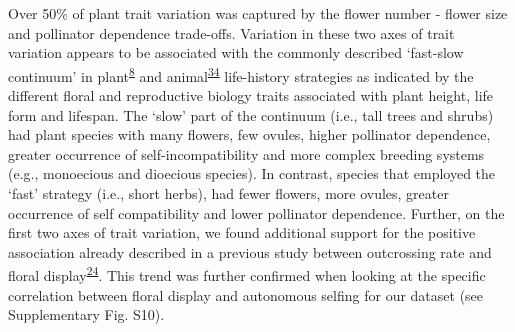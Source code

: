 \documentclass[12pt,a4paper,]{article}
\begin{document}
Over 50\% of plant trait variation was captured by the flower number -
flower size and pollinator dependence trade-offs. Variation in these two
axes of trait variation appears to be associated with the commonly
described `fast-slow continuum' in
plant\textsuperscript{\protect\hyperlink{ref-salguero2016}{8}} and
animal\textsuperscript{\protect\hyperlink{ref-healy2019}{34}}
life-history strategies as indicated by the different floral and
reproductive biology traits associated with plant height, life form and
lifespan. The `slow' part of the continuum (i.e., tall trees and shrubs)
had plant species with many flowers, few ovules, higher pollinator
dependence, greater occurrence of self-incompatibility and more complex
breeding systems (e.g., monoecious and dioecious species). In contrast,
species that employed the `fast' strategy (i.e., short herbs), had fewer
flowers, more ovules, greater occurrence of self compatibility and lower
pollinator dependence. Further, on the first two axes of trait
variation, we found additional support for the positive association
already described in a previous study between outcrossing rate and
floral
display\textsuperscript{\protect\hyperlink{ref-goodwillie2010}{24}}.
This trend was further confirmed when looking at the specific
correlation between floral display and autonomous selfing for our
dataset (see Supplementary Fig. S10).
\end{document}

